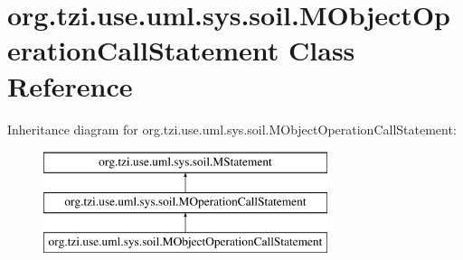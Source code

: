 \hypertarget{classorg_1_1tzi_1_1use_1_1uml_1_1sys_1_1soil_1_1_m_object_operation_call_statement}{\section{org.\-tzi.\-use.\-uml.\-sys.\-soil.\-M\-Object\-Operation\-Call\-Statement Class Reference}
\label{classorg_1_1tzi_1_1use_1_1uml_1_1sys_1_1soil_1_1_m_object_operation_call_statement}
}
Inheritance diagram for org.\-tzi.\-use.\-uml.\-sys.\-soil.\-M\-Object\-Operation\-Call\-Statement\-:\begin{figure}[H]
\begin{center}
\leavevmode
\includegraphics[height=3.000000cm]{classorg_1_1tzi_1_1use_1_1uml_1_1sys_1_1soil_1_1_m_object_operation_call_statement}
\end{center}
\end{figure}
